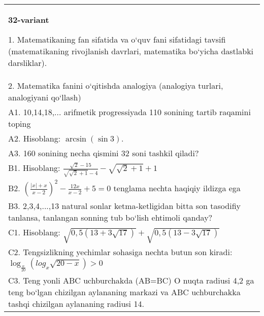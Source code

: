\documentclass{article}
\begin{document}
\begin{tabular}{m{17cm}}
\textbf{32-variant}

1. Matematikaning fan sifatida va o‘quv fani sifatidagi tavsifi (matematikaning rivojlanish davrlari, matematika bo‘yicha dastlabki darsliklar). \\
2. Matematika fanini o‘qitishda analogiya (analogiya turlari, analogiyani qo‘llash) \\
A1. 10,14,18,... arifmetik progressiyada 110 sonining tartib raqamini toping \\
A2. Hisoblang: \(\arcsin (\sin3) \). \\
A3. 160 sonining necha qismini 32 soni tashkil qiladi? \\
B1. Hisoblang: \(\frac{\sqrt{2} - 15}{\sqrt{\sqrt{2} + 1} - 4} - \sqrt{\sqrt{2} + 1} + 1\) \\
B2. $ (\frac{|x| + x}{x-2}) ^{2} - \frac{12x}{x-2} + 5 = 0$ tenglama nechta haqiqiy ildizga ega \\
B3. 2,3,4,...,13 natural sonlar ketma-ketligidan bitta son tasodifiy tanlansa, tanlangan sonning tub bo‘lish ehtimoli qanday? \\
C1. Hisoblang: \(\sqrt{0,5 (13 + 3\sqrt{17}) } + \sqrt{0,5 (13 - 3\sqrt{17}) }\) \\
C2. Tengsizlikning yechimlar sohasiga nechta butun son kiradi: \(\log_{\frac{x}{20}} (log_{x}\sqrt{20 - x}) > 0\) \\
C3. Teng yonli ABC uchburchakda (AB=BC) O nuqta radiusi 4,2 ga teng bo‘lgan chizilgan aylananing markazi va ABC uchburchakka tashqi chizilgan aylananing radiusi 14. \\

\end{tabular}
\vspace{1cm}
\end{document}

